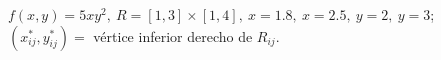 \item $f(x, y) = 5xy^2, \ R = [1, 3] \times [1, 4], \ x = 1.8, \ x = 2.5, \ y = 2, \ y = 3$; \\ $(x_{ij}^*, y_{ij}^*) =$ vértice inferior derecho de $R_{ij}$.
